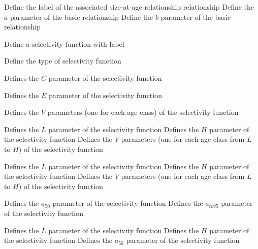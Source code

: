 \par\textbf{}\par
{} {Define the label of the associated size-at-age relationship relationship}
 {Define the $a$ parameter of the basic relationship}
 {Define the $b$ parameter of the basic relationship}
\par {} {Define a selectivity function with label}\par
{} {Define the type of selectivity function}
\par\textbf{}\par
{} {Defines the $C$ parameter of the selectivity function}
\par\textbf{}\par
{} {Defines the $E$ parameter of the selectivity function}
\par\textbf{}\par
{} {Defines the $V$ parameters (one for each age class) of the selectivity function}
\par\textbf{}\par
{} {Defines the $L$ parameter of the selectivity function}
 {Defines the $H$ parameter of the selectivity function}
 {Defines the $V$ parameters (one for each age class from $L$ to $H$) of the selectivity function}
\par\textbf{}\par
{} {Defines the $L$ parameter of the selectivity function}
 {Defines the $H$ parameter of the selectivity function}
 {Defines the $V$ parameters (one for each age class from $L$ to $H$) of the selectivity function}
\par\textbf{}\par
{} {Defines the $a_{50}$ parameter of the selectivity function}
 {Defines the $a_{to95}$ parameter of the selectivity function}
\par\textbf{}\par
{} {Defines the $L$ parameter of the selectivity function}
 {Defines the $H$ parameter of the selectivity function}
 {Defines the $a_{50}$ parameter of the selectivity function}

